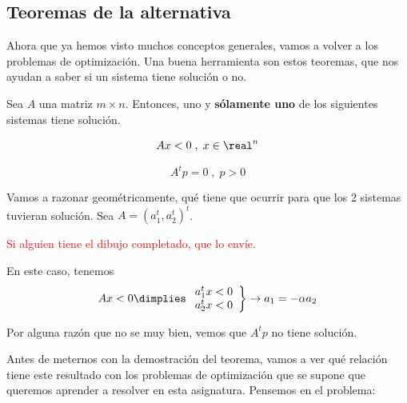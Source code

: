 \subsection{Teoremas de la alternativa}

Ahora que ya hemos visto muchos conceptos generales, vamos a volver a los problemas de optimización.
Una buena herramienta son estos teoremas, que nos ayudan a saber si un sistema tiene solución o no.

\begin{lemma}
Sea $A$ una matriz $m\times n$. Entonces, uno y \textbf{sólamente uno} de los siguientes sistemas tiene solución.

\begin{equation}
Ax < 0\;,\; x\in\real^n
\label{eq:Gordan_1}
\end{equation}

\begin{equation}
A^tp = 0\;,\; p > 0
\label{eq:Gordan_2}
\end{equation}
\end{lemma}


Vamos a razonar geométricamente, qué tiene que ocurrir para que los 2 sistemas tuvieran solución. Sea $A = (a_1^t,a_2^t)^t$.

\textcolor{red}{Si alguien tiene el dibujo completado, que lo envíe.}

\begin{figure}[h]
\centering
{}
\end{figure}

En este caso, tenemos \[Ax < 0 \dimplies \left.\begin{array}{c}a_1^tx < 0\\a_2^tx<0\end{array}\right\} \to a_1 = -\alpha a_2\]


Por alguna razón que no se muy bien, vemos que $A^tp$ no tiene solución.


Antes de meternos con la demostración del teorema, vamos a ver qué relación tiene este resultado con los problemas de optimización que se supone que queremos aprender a resolver en esta asignatura.
Pensemos en el problema:
\begin{ioprob}
\end{ioprob}

